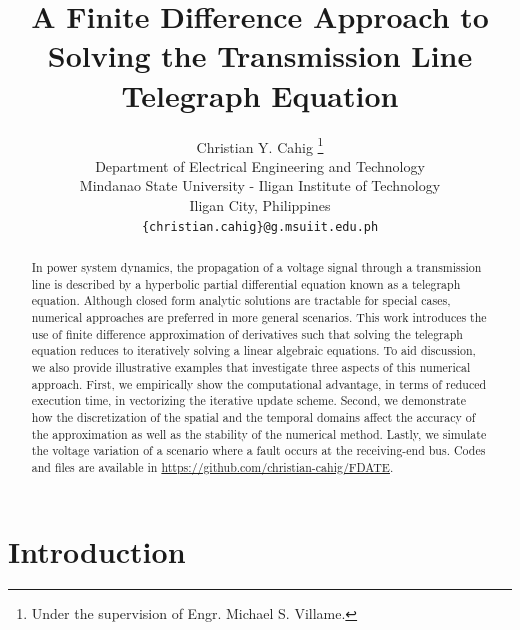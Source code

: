 \documentclass{article}
\title{A Finite Difference Approach to Solving the Transmission Line Telegraph Equation}
\author{Christian Y. Cahig
	\thanks{Under the supervision of Engr. Michael S. Villame.} \\
	Department of Electrical Engineering and Technology\\
	Mindanao State University - Iligan Institute of Technology\\
	Iligan City, Philippines \\
	\texttt{\{christian.cahig\}@g.msuiit.edu.ph} \\
}
\begin{document}
\maketitle

\begin{abstract}

In power system dynamics, the propagation of a voltage signal through a transmission line
is described by a hyperbolic partial differential equation known as a telegraph equation.
Although closed form analytic solutions are tractable for special cases,
numerical approaches are preferred in more general scenarios.
This work introduces the use of finite difference approximation of derivatives
such that solving the telegraph equation reduces to iteratively solving a linear algebraic equations.
To aid discussion, we also provide illustrative examples that investigate three aspects of this numerical approach.
First, we empirically show the computational advantage,
in terms of reduced execution time,
in vectorizing the iterative update scheme.
Second, we demonstrate how the discretization of the spatial and the temporal domains
affect the accuracy of the approximation as well as the stability of the numerical method.
Lastly, we simulate the voltage variation of a scenario where a fault occurs at the receiving-end bus.
Codes and files are available in \url{https://github.com/christian-cahig/FDATE}.

\end{abstract}

\section{Introduction}
\label{sec: Introduction}
\end{document}
